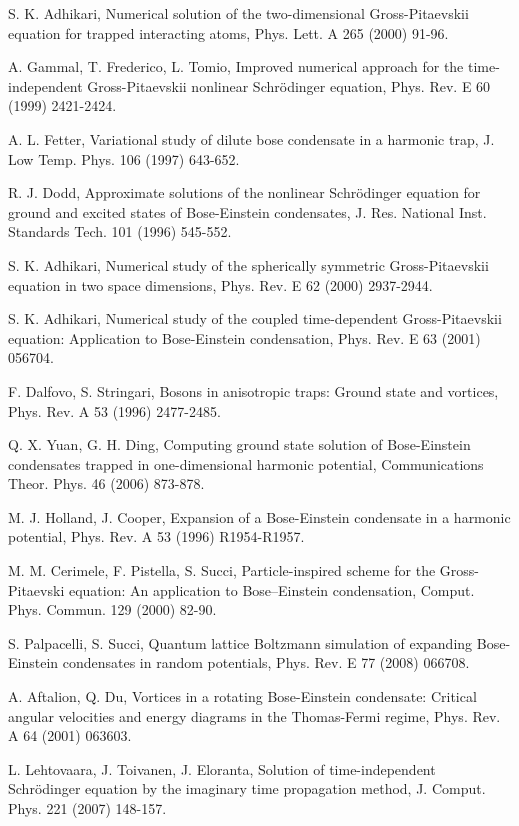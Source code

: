 \documentclass[onecolumn]{elsart3p}
\begin{document}
\begin{thebibliography}{99}
S. K. Adhikari, Numerical solution of the two-dimensional
Gross-Pitaevskii equation for trapped interacting atoms, Phys. Lett. A
265 (2000) 91-96.

A. Gammal, T. Frederico, L. Tomio, Improved numerical approach for the
time-independent Gross-Pitaevskii nonlinear Schr\"odinger equation,
Phys. Rev. E 60 (1999) 2421-2424.

A. L. Fetter, Variational study of dilute bose condensate in a
harmonic trap, J. Low Temp. Phys. 106 (1997) 643-652.

R. J. Dodd, Approximate solutions of the nonlinear Schr\"odinger
equation for ground and excited states of Bose-Einstein condensates,
J. Res.  National Inst.  Standards Tech. 101 (1996) 545-552.

S. K. Adhikari, Numerical study of the spherically symmetric
Gross-Pitaevskii equation in two space dimensions, Phys. Rev. E 62
(2000) 2937-2944.

S. K. Adhikari, Numerical study of the coupled time-dependent
Gross-Pitaevskii equation: Application to Bose-Einstein condensation,
Phys. Rev. E 63 (2001) 056704.

F. Dalfovo, S. Stringari, Bosons in anisotropic traps: Ground state
and vortices, Phys. Rev. A  53 (1996) 2477-2485.

Q. X.  Yuan, G. H. Ding, Computing ground state solution of
Bose-Einstein condensates trapped in one-dimensional harmonic
potential, Communications Theor. Phys.  46 (2006) 873-878.


M. J. Holland, J. Cooper, Expansion of a Bose-Einstein
condensate in a harmonic potential,
Phys. Rev. A 53 (1996) R1954-R1957.

M. M.  Cerimele, F. Pistella, S. Succi,
Particle-inspired scheme for the Gross-Pitaevski equation: An
application to Bose--Einstein condensation,
Comput. Phys. Commun. 129 (2000) 82-90.

S. Palpacelli, S. Succi,
Quantum lattice Boltzmann simulation of expanding Bose-Einstein
condensates in random potentials,
Phys. Rev. E 77 (2008) 066708.

A. Aftalion, Q. Du, Vortices in a rotating Bose-Einstein condensate:
Critical angular velocities and energy diagrams in the Thomas-Fermi
regime, Phys. Rev. A 64 (2001) 063603.

  	L. Lehtovaara, 	 
J. Toivanen,
J. Eloranta, Solution of time-independent Schr\"odinger equation by the 
imaginary time propagation method, J. Comput. Phys. 
{221} (2007) 148-157. 


\end{thebibliography}
\end{document}
